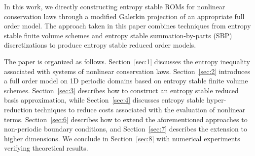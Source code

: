 \documentclass[preprint,10pt]{elsarticle}
\theoremstyle{definition}
\theoremstyle{lemma}
\theoremstyle{theorem}
\theoremstyle{assumption}
\begin{document}
%
%

In this work, we directly constructing entropy stable ROMs for nonlinear conservation laws through a modified Galerkin projection of an appropriate full order model.  The approach taken in this paper combines techniques from entropy stable finite volume schemes \cite{tadmor1987numerical, tadmor2003entropy} and entropy stable summation-by-parts (SBP) discretizations \cite{fisher2013high, carpenter2014entropy, chen2017entropy, crean2018entropy, chan2017discretely, chan2019skew} to produce entropy stable reduced order models.  

The paper is organized as follows.  Section~\ref{sec:1} discusses the entropy inequality associated with systems of nonlinear conservation laws.  Section~\ref{sec:2} introduces a full order model on 1D periodic domains based on entropy stable finite volume schemes.  Section~\ref{sec:3} describes how to construct an entropy stable reduced basis approximation, while Section~\ref{sec:4} discusses entropy stable hyper-reduction techniques to reduce costs associated with the evaluation of nonlinear terms.  Section~\ref{sec:6} describes how to extend the aforementioned approaches to non-periodic boundary conditions, and Section~\ref{sec:7} describes the extension to higher dimensions.  We conclude in Section~\ref{sec:8} with numerical experiments verifying theoretical results.
\end{document}
